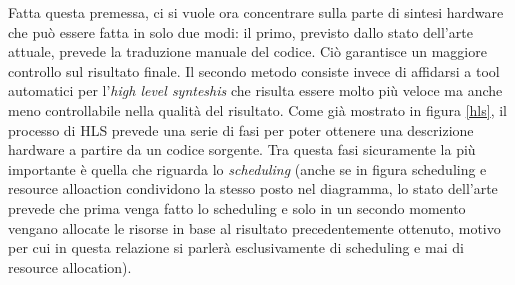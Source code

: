 \documentclass[]{IEEEtran}
\begin{document}
Fatta questa premessa, ci si vuole ora concentrare sulla parte di sintesi hardware che può essere fatta in solo due modi: il primo, previsto dallo stato dell'arte attuale, prevede la traduzione manuale del codice. Ciò garantisce un maggiore controllo sul risultato finale. Il secondo metodo consiste invece di affidarsi a tool automatici per l'\emph{high level synteshis} che risulta essere molto più veloce ma anche meno controllabile nella qualità del risultato. Come già mostrato in figura \ref{hls}, il processo di HLS prevede una serie di fasi per poter ottenere una descrizione hardware a partire da un codice sorgente. Tra questa fasi sicuramente la più importante è quella che riguarda lo \emph{scheduling} (anche se in figura scheduling e resource alloaction condividono la stesso posto nel diagramma, lo stato dell'arte prevede che prima venga fatto lo scheduling e solo in un secondo momento vengano allocate le risorse in base al risultato precedentemente ottenuto, motivo per cui in questa relazione si parlerà esclusivamente di scheduling e mai di resource allocation).
\end{document}
